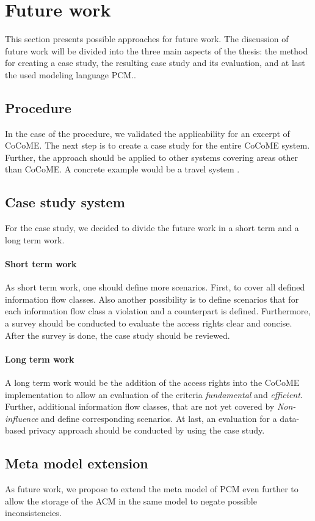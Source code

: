 \section{Future work} 
\label{FW}
This section presents possible approaches for future work. The discussion of future work will be divided into the three main aspects of the thesis: the method for creating a case study, the resulting case study and its evaluation, and at last the used modeling language PCM.. 
\subsection{Procedure}
In the case of the procedure, we validated the applicability for an excerpt of CoCoME. The next step is to create a case study for the entire CoCoME system. Further, the approach should be applied to other systems covering areas other than CoCoME. A concrete example would be a travel system \cite{Travelsystem}.
\subsection{Case study system}
For the case study, we decided to divide the future work in a short term and a long term work.\\
\paragraph{Short term work}
As short term work, one should define more scenarios. First, to cover all defined information flow classes. Also another possibility is to define scenarios that for each information flow class a violation and a counterpart is defined. Furthermore, a survey should be conducted to evaluate the access rights clear and concise. After the survey is done, the case study should be reviewed.
\paragraph{Long term work}
A long term work would be the addition of the access rights into the CoCoME implementation to allow an evaluation of the criteria \textit{fundamental} and \textit{efficient}. Further, additional information flow classes, that are not yet covered by \textit{Non-influence} and define corresponding scenarios. At last, an evaluation for a data-based privacy approach should be conducted by using the case study. 
\subsection{Meta model extension}
As future work, we propose to extend the meta model of PCM even further to allow the storage of the ACM in the same model to negate possible inconsistencies.
